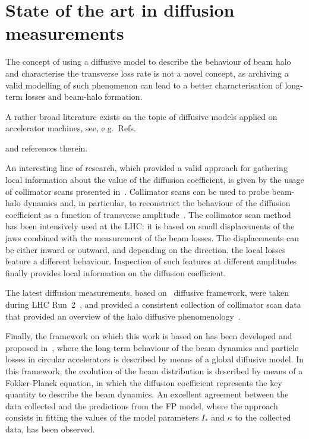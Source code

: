 \section{State of the art in diffusion measurements}

The concept of using a diffusive model to describe the behaviour of beam halo and characterise the transverse loss rate is not a novel concept, as archiving a valid modelling of such phenomenon can lead to a better characterisation of long-term losses and beam-halo formation.

A rather broad literature exists on the topic of diffusive models applied on accelerator machines, see, e.g.\ Refs.~{\cite{Burnod:205343,Meddahi:223301,PhysRevLett.68.33,gerasimov1992applicability,zimmermann1994transverse,PhysRevLett.77.1051,PhysRevSTAB.5.074001,flilleriii:pac03-rpag004} and references therein. %

An interesting line of research, which provided a valid approach for gathering local information about the value of the diffusion coefficient, is given by the usage of collimator scans presented in~\cite{MESS1994279}. Collimator scans can be used to probe beam-halo dynamics and, in particular, to reconstruct the behaviour of the diffusion coefficient as a function of transverse amplitude~\cite{stancari2011diffusion,PhysRevSTAB.16.021003,PhysRevAccelBeams.23.044802}. The collimator scan method has been intensively used at the LHC: it is based on small displacements of the jaws combined with the measurement of the beam losses. The displacements can be either inward or outward, and depending on the direction, the local losses feature a different behaviour. Inspection of such features at different amplitudes finally provides local information on the diffusion coefficient.

The latest diffusion measurements, based on~\cite{stancari2011diffusion} diffusive framework, were taken during LHC Run~2~\cite{Valentino:2280928}, and provided a consistent collection of collimator scan data that provided an overview of the halo diffusive phenomenology~\cite{PhysRevAccelBeams.23.044802}.  

Finally, the framework on which this work is based on has been developed and proposed in~\cite{Bazzani:2019lse,bazzani2020diffusion}, where the long-term behaviour of the beam dynamics and particle losses in circular accelerators is described by means of a global diffusive model. In this framework, the evolution of the beam distribution is described by means of a Fokker-Planck equation, in which the diffusion coefficient represents the key quantity to describe the beam dynamics. An excellent agreement between the data collected and the predictions from the FP model, where the approach consists in fitting the values of the model parameters $I_\ast$ and $\kappa$ to the collected data, has been observed.


}
